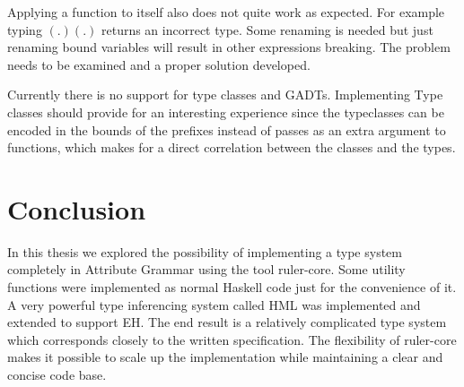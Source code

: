 Applying a function to itself also does not quite work as expected. For example typing $(.)(.)$ returns an incorrect type. Some renaming is needed but just renaming bound variables will result in other expressions breaking. The problem needs to be examined and a proper solution developed.
 
Currently there is no support for type classes and GADTs. Implementing Type classes should provide for an interesting experience since the typeclasses can be encoded in the bounds of the prefixes instead of passes as an extra argument to functions, which makes for a direct correlation between the classes and the types.
\section{Conclusion}
In this thesis we explored the possibility of implementing a type system completely in Attribute Grammar using the tool ruler-core. Some utility functions were implemented as normal Haskell code just for the convenience of it. A very powerful type inferencing system called HML was implemented and extended to support EH. The end result is a relatively complicated type system which corresponds closely to the written specification. The flexibility of ruler-core makes it possible to scale up the implementation while maintaining a clear and concise code base.
